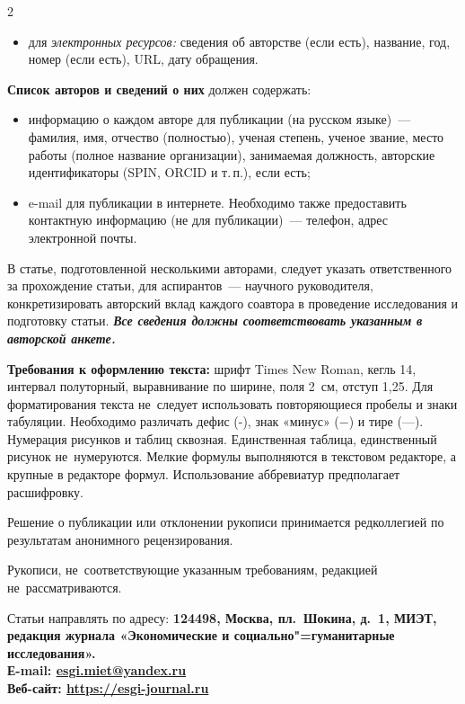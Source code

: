 \begin{multicols}{2}
\begin{itemize}
\item  для \emph{электронных ресурсов:} сведения об авторстве (если есть),
название, год, номер (если есть), URL, дату обращения.
\end{itemize}

\textbf{Список авторов и сведений о них} должен содержать:
\begin{itemize}
\item  информацию о каждом авторе для публикации (на русском языке)~— 
фамилия, имя, отчество (полностью), ученая степень, ученое звание, место
работы (полное название организации), занимаемая должность, авторские
идентификаторы (SPIN, ORCID и т.\,п.), если есть;

\item  e-mail для публикации в интернете. Необходимо также предоставить
контактную информацию (не для публикации)~— телефон, адрес электронной
почты.
\end{itemize}

В статье, подготовленной несколькими авторами, следует указать
ответственного за прохождение статьи, для аспирантов~— научного
руководителя, конкретизировать авторский вклад каждого соавтора в
проведение исследования и подготовку статьи. \emph{\textbf{Все сведения
должны соответствовать указанным в авторской анкете.}}

\textbf{Требования к оформлению текста:} шрифт Times New Roman, кегль
14, интервал полуторный, выравнивание по ширине, поля 2~см, отступ 1,25.
Для форматирования текста не~следует использовать повторяющиеся пробелы
и знаки табуляции. Необходимо различать дефис (-), знак «минус» (−) и
тире (---). Нумерация рисунков и таблиц сквозная. Единственная таблица,
единственный рисунок не~нумеруются. Мелкие формулы выполняются в
текстовом редакторе, а крупные в редакторе формул. Использование
аббревиатур предполагает расшифровку.

Решение о публикации или отклонении рукописи принимается редколлегией по
результатам анонимного рецензирования.

Рукописи, не~соответствующие указанным требованиям, редакцией не~рассматриваются.\newcol

\begin{flushleft}
    Статьи направлять по адресу: \bfseries 124498,
    Москва, пл.~Шокина, д.~1, МИЭТ,
    редакция журнала «Экономические
    и социально"=гуманитарные исследования».\\
    Е-mail: \href{mailto:esgi.miet@yandex.ru}{esgi.miet@yandex.ru}\\
Веб-сайт: \url{https://esgi-journal.ru}    \par
\end{flushleft}

\end{multicols}

\setmainlinespread

\label{authors:end}